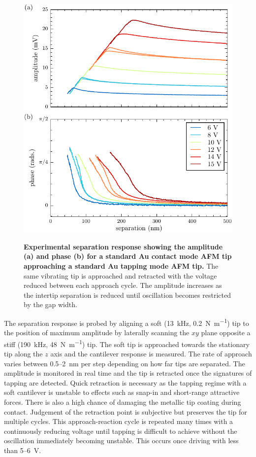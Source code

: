 \documentclass{article}
\begin{document}
\begin{figure}[bt]
\centering
{\includegraphics{figures/exp_separation_response}}
{\caption[Experimental separation response showing the amplitude (a) and phase (b) for a standard Au contact mode AFM tip approaching a standard Au tapping mode AFM tip]{\textbf{Experimental separation response showing the amplitude (a) and phase (b) for a standard Au contact mode AFM tip approaching a standard Au tapping mode AFM tip.} The same vibrating tip is approached and retracted with the voltage reduced between each approach cycle. The amplitude increases as the intertip separation is reduced until oscillation becomes restricted by the gap width.}
\label{fig:exp_sep_resp}}
\end{figure}

The separation response is probed by aligning a soft (\SI{13}{kHz}, \SI{0.2}{N\per\metre}) tip to the position of maximum amplitude by laterally scanning the $xy$ plane opposite a stiff (\SI{190}{kHz}, \SI{48}{N\per\metre}) tip. The soft tip is approached towards the stationary tip along the $z$ axis and the cantilever response is measured. The rate of approach varies between 0.5--\SI{2}{nm} per step depending on how far tips are separated. The amplitude is monitored in real time and the tip is retracted once the signatures of tapping are detected. Quick retraction is necessary as the tapping regime with a soft cantilever is unstable to effects such as snap-in and short-range attractive forces. There is also a high chance of damaging the metallic tip coating during contact. Judgement of the retraction point is subjective but preserves the tip for multiple cycles. This approach-reaction cycle is repeated many times with a continuously reducing voltage until tapping is difficult to achieve without the oscillation immediately becoming unstable. This occurs once driving with less than 5--\SI{6}{V}.
\end{document}
